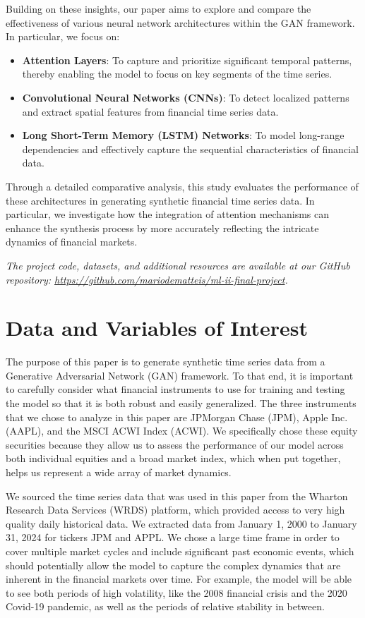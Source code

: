 \documentclass{article}
\begin{document}
Building on these insights, our paper aims to explore and compare the effectiveness of various neural network architectures within the GAN framework. In particular, we focus on:
\begin{itemize}
    \item \textbf{Attention Layers}: To capture and prioritize significant temporal patterns, thereby enabling the model to focus on key segments of the time series.
    \item \textbf{Convolutional Neural Networks (CNNs)}: To detect localized patterns and extract spatial features from financial time series data.
    \item \textbf{Long Short-Term Memory (LSTM) Networks}: To model long-range dependencies and effectively capture the sequential characteristics of financial data.
\end{itemize}

Through a detailed comparative analysis, this study evaluates the performance of these architectures in generating synthetic financial time series data. In particular, we investigate how the integration of attention mechanisms can enhance the synthesis process by more accurately reflecting the intricate dynamics of financial markets.

\vspace{1em}
\noindent\textit{The project code, datasets, and additional resources are available at our GitHub repository: \url{https://github.com/mariodematteis/ml-ii-final-project}.}

\section{Data and Variables of Interest}

The purpose of this paper is to generate synthetic time series data from a Generative Adversarial Network (GAN) framework. To that end, it is important to carefully consider what financial instruments to use for training and testing the model so that it is both robust and easily generalized. The three instruments that we chose to analyze in this paper are JPMorgan Chase (JPM), Apple Inc. (AAPL), and the MSCI ACWI Index (ACWI). We specifically chose these equity securities because they allow us to assess the performance of our model across both individual equities and a broad market index, which when put together, helps us represent a wide array of market dynamics.

We sourced the time series data that was used in this paper from the Wharton Research Data Services (WRDS) platform, which provided access to very high quality daily historical data. We extracted data from January 1, 2000 to January 31, 2024 for tickers JPM and APPL. We chose a large time frame in order to cover multiple market cycles and include significant past economic events, which should potentially allow the model to capture the complex dynamics that are inherent in the financial markets over time. For example, the model will be able to see both periods of high volatility, like the 2008 financial crisis and the 2020 Covid-19 pandemic, as well as the periods of relative stability in between.
\end{document}
